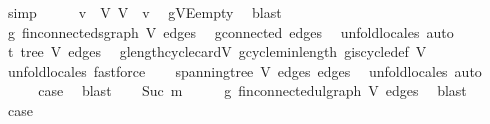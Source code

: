\begin{isabellebody}
\ simp\isanewline
\ \ \isamarkupfalse%
\ \isamarkupfalse%
\ v\ \ V{\isacharcolon}{\kern0pt}\ {\isachardoublequoteopen}V\ {\isacharequal}{\kern0pt}\ {\isacharbraceleft}{\kern0pt}v{\isacharbraceright}{\kern0pt}{\isachardoublequoteclose}\ \isamarkupfalse%
\ g{\isachardot}{\kern0pt}V{\isacharunderscore}{\kern0pt}E{\isacharunderscore}{\kern0pt}empty\ \isamarkupfalse%
\ blast\isanewline
\ \ \isamarkupfalse%
\ g{\isacharprime}{\kern0pt}{\isacharcolon}{\kern0pt}\ fin{\isacharunderscore}{\kern0pt}connected{\isacharunderscore}{\kern0pt}sgraph\ V\ edges\ \isamarkupfalse%
\ g{\isachardot}{\kern0pt}connected\ edges\ \isamarkupfalse%
\ {\isacharparenleft}{\kern0pt}unfold{\isacharunderscore}{\kern0pt}locales{\isacharcomma}{\kern0pt}\ auto{\isacharparenright}{\kern0pt}\isanewline
\ \ \isamarkupfalse%
\ t{\isacharcolon}{\kern0pt}\ tree\ V\ edges\ \isamarkupfalse%
\ g{\isachardot}{\kern0pt}length{\isacharunderscore}{\kern0pt}cycle{\isacharunderscore}{\kern0pt}card{\isacharunderscore}{\kern0pt}V\ g{\isacharprime}{\kern0pt}{\isachardot}{\kern0pt}cycle{}{\isacharunderscore}{\kern0pt}min{\isacharunderscore}{\kern0pt}length\ g{\isachardot}{\kern0pt}is{\isacharunderscore}{\kern0pt}cycle{}{\isacharunderscore}{\kern0pt}def\ V\ \isamarkupfalse%
\ {\isacharparenleft}{\kern0pt}unfold{\isacharunderscore}{\kern0pt}locales{\isacharcomma}{\kern0pt}\ fastforce{\isacharparenright}{\kern0pt}\isanewline
\ \ \isamarkupfalse%
\ {\isachardoublequoteopen}spanning{\isacharunderscore}{\kern0pt}tree\ V\ edges\ edges{\isachardoublequoteclose}\ \isamarkupfalse%
\ {\isacharparenleft}{\kern0pt}unfold{\isacharunderscore}{\kern0pt}locales{\isacharcomma}{\kern0pt}\ auto{\isacharparenright}{\kern0pt}\ \isanewline
\ \ \isamarkupfalse%
\ \isamarkupfalse%
\ {\isacharquery}{\kern0pt}case\ \isamarkupfalse%
\ blast\isanewline
{}\isamarkupfalse%
\isanewline
\ \ \isamarkupfalse%
\ {\isacharparenleft}{\kern0pt}Suc\ m{\isacharparenright}{\kern0pt}\isanewline
\ \ \isamarkupfalse%
\ \isamarkupfalse%
\ g{\isacharcolon}{\kern0pt}\ fin{\isacharunderscore}{\kern0pt}connected{\isacharunderscore}{\kern0pt}ulgraph\ V\ edges\ \isamarkupfalse%
\ blast\isanewline
\ \ \isamarkupfalse%
\ {\isacharquery}{\kern0pt}case\isanewline
\ \ \isamarkupfalse%

\end{isabellebody}
